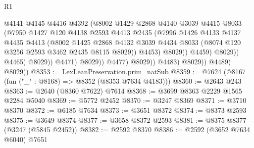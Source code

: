 \begin{lexlean}{R1}
\begin{coremodule}
                                        @4141
                                        @4145
                                        @4416
                                        @4392
                                        (@8002
                                          @1429
                                          @2868
                                          @4140
                                          @3039
                                          @4415
                                          @8033
                                          (@7950
                                            @1427
                                            @120
                                            @4138
                                            @2593
                                            @4413
                                            @2435
                                            (@7996
                                              @1426
                                              @4133
                                              @4137
                                              @4435
                                              @4413
                                              (@8002
                                                @1425
                                                @2868
                                                @4132
                                                @3039
                                                @4434
                                                @8033
                                                (@8074 @120 @3256 @2593 @3462 @2435 @8115 @8029))
                                              @4453)
                                            @8029))
                                        @4459)
                                      @8029))
                                  @4465)
                                @8029))
                            @4471)
                          @8029))
                      @4477)
                    @8029))
                @4483)
              @8029))
          @4489)
        @8029))
@8353 := LexLeanPreservation.prim_natSub
@8359 := @7624 (@8167 (fun ("_" : @8168) => @8352 (@8353 @7634 @4183)))
@8360 := @2643 @243
@8363 := @2640 (@8360 @7622) @7614
@8368 := @3699 @8363 @2229 @1565 @2284 @5040
@8369 := @5772 @2452
@8370 := @3247 @8369
@8371 := @3710 @8370
@8372 := @6185 @7634
@8373 := @3651 @8372
@8374 := @8373 @2593
@8375 := @3649 @8374
@8377 := @3658 @8372 @2593
@8381 := @8375 @8377 (@3247 (@5845 @2452))
@8382 := @2592 @8370
@8386 := @2592 (@3652 @7634 @6040) @7651

\end{coremodule}
\end{lexlean}
